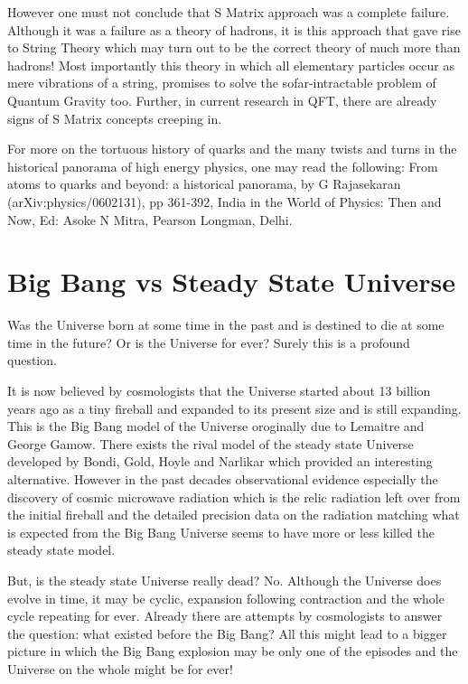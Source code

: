 However one must not conclude that S Matrix approach was a complete
failure. Although it was a failure as a theory of hadrons, it is
this approach that gave rise to String Theory which may turn out to
be the correct theory of much more than hadrons! Most importantly
this theory in which all elementary particles occur as mere vibrations 
of a string, promises to solve the sofar-intractable problem of
Quantum Gravity too. Further, in current research in QFT, there are
already signs of S Matrix concepts creeping in. 

For more on the tortuous history of quarks and the many twists
and turns in the historical panorama of high energy physics, one
may read the following: From atoms to quarks and beyond: a historical
panorama, by G Rajasekaran (arXiv:physics/0602131), pp 361-392,
India in the World of Physics: Then and Now, Ed: Asoke N Mitra,
Pearson Longman, Delhi.

\section{Big Bang vs Steady State Universe} 

Was the Universe born at some time in the past and is destined 
to die at some time in the future? Or is the Universe for ever?
Surely this is a profound question.

It is now believed by cosmologists that the Universe started
about 13 billion years ago as a tiny fireball and expanded
to its present size and is still expanding. This is the
Big Bang model of the Universe oroginally due to Lemaitre
and George Gamow. There exists the rival model of the
steady state Universe developed by Bondi, Gold, Hoyle and 
Narlikar which provided an interesting alternative. However
in the past decades observational evidence especially the
discovery of cosmic microwave radiation which is the relic radiation
left over from the initial fireball and the detailed precision data
on the radiation matching what is expected from the Big Bang Universe
seems to have more or less killed the steady state model.

But, is the steady state Universe really dead? No.
Although the Universe does evolve in time, it may be cyclic,
expansion following contraction and the whole cycle repeating
for ever. Already there are attempts
by cosmologists to answer the question: what existed before
the Big Bang? All this might lead to a bigger picture 
in which the Big Bang explosion may be only one of the episodes and the
Universe on the whole might be for ever! 


